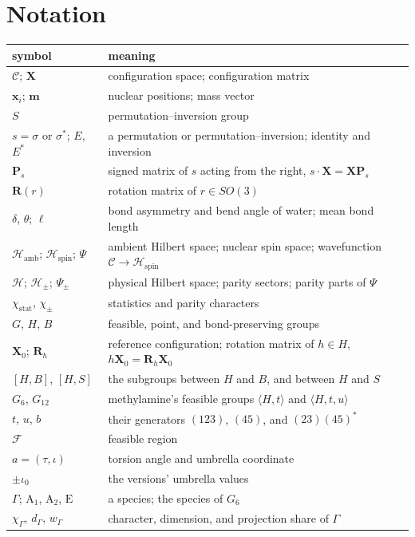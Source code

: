 \documentclass[11pt]{article}
\newcommand{\conf}{\mathcal{C}}
\newcommand{\hilb}{\mathcal{H}}
\newcommand{\spin}{\mathcal{H}_{\mathrm{spin}}}
\newcommand{\act}{\mathbin{\cdot}}
\newcommand{\stat}{\chi_{\mathrm{stat}}}
\newcommand{\X}{\mathbf{X}}
\newcommand{\Pmat}{\mathbf{P}}
\newcommand{\Rmat}{\mathbf{R}}
\begin{document}
\section*{Notation}
{\renewcommand{\arraystretch}{1.15}
\begin{tabular}{ll}
\hline
symbol & meaning\\
\hline
$\conf$; $\X$ & configuration space; configuration matrix\\
$\mathbf x_i$; $\mathbf m$ & nuclear positions; mass vector\\
$S$ & permutation--inversion group\\
$s=\sigma$ or $\sigma^*$; $E$, $E^*$ & a permutation or permutation--inversion; identity and inversion\\
$\Pmat_s$ & signed matrix of $s$ acting from the right, $s\act\X=\X\Pmat_s$\\
$\Rmat(r)$ & rotation matrix of $r\in SO(3)$\\
$\delta$, $\theta$; $\ell$ & bond asymmetry and bend angle of water; mean bond length\\
$\hilb_{\mathrm{amb}}$; $\spin$; $\Psi$ & ambient Hilbert space; nuclear spin space; wavefunction $\conf\to\spin$\\
$\hilb$; $\hilb_\pm$; $\Psi_\pm$ & physical Hilbert space; parity sectors; parity parts of $\Psi$\\
$\stat$, $\chi_\pm$ & statistics and parity characters\\[1ex]
$G$, $H$, $B$ & feasible, point, and bond-preserving groups\\
$\X_0$; $\Rmat_h$ & reference configuration; rotation matrix of $h\in H$, $h\X_0=\Rmat_h\X_0$\\
$[H,B]$, $[H,S]$ & the subgroups between $H$ and $B$, and between $H$ and $S$\\
$G_6$, $G_{12}$ & methylamine's feasible groups $\langle H,t\rangle$ and $\langle H,t,u\rangle$\\
$t$, $u$, $b$ & their generators $(123)$, $(45)$, and $(23)(45)^*$\\
$\mathcal F$ & feasible region\\
$a=(\tau,\iota)$ & torsion angle and umbrella coordinate\\
$\pm\iota_0$ & the versions' umbrella values\\[1ex]
$\Gamma$; $\mathrm A_1$, $\mathrm A_2$, $\mathrm E$ & a species; the species of $G_6$\\
$\chi_\Gamma$, $d_\Gamma$, $w_\Gamma$ & character, dimension, and projection share of $\Gamma$\\

\end{tabular}}
\end{document}
